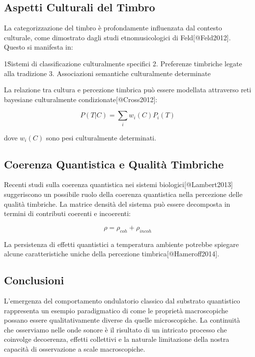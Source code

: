 \documentclass[a4paper,11pt]{article}
\begin{document}
\subsection{Aspetti Culturali del Timbro}

La categorizzazione del timbro è profondamente influenzata dal contesto
culturale, come dimostrato dagli studi etnomusicologici di
Feld[@Feld2012]. Questo si manifesta in:

1\. Sistemi di classificazione culturalmente specifici 2. Preferenze
timbriche legate alla tradizione 3. Associazioni semantiche
culturalmente determinate

La relazione tra cultura e percezione timbrica può essere modellata
attraverso reti bayesiane culturalmente condizionate[@Cross2012]:

\begin{equation}
P(T|C) = \sum_i w_i(C)P_i(T)
\end{equation}


dove $w_i(C)$ sono pesi culturalmente determinati.

\subsection{Coerenza Quantistica e Qualità Timbriche}

Recenti studi sulla coerenza quantistica nei sistemi
biologici[@Lambert2013] suggeriscono un possibile ruolo della coerenza
quantistica nella percezione delle qualità timbriche. La matrice densità
del sistema può essere decomposta in termini di contributi coerenti e
incoerenti:

\begin{equation}
\rho = \rho_{coh} + \rho_{incoh}
\end{equation}


La persistenza di effetti quantistici a temperatura ambiente potrebbe
spiegare alcune caratteristiche uniche della percezione
timbrica[@Hameroff2014].

\subsection{Conclusioni}

L'emergenza del comportamento ondulatorio classico dal substrato
quantistico rappresenta un esempio paradigmatico di come le proprietà
macroscopiche possano essere qualitativamente diverse da quelle
microscopiche. La continuità che osserviamo nelle onde sonore è il
risultato di un intricato processo che coinvolge decoerenza, effetti
collettivi e la naturale limitazione della nostra capacità di
osservazione a scale macroscopiche.
\end{document}
